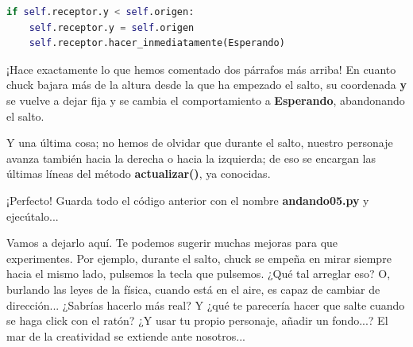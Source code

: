 \documentclass{article}
\begin{document}
\begin{lstlisting}[language=Python]
if self.receptor.y < self.origen:
    self.receptor.y = self.origen
    self.receptor.hacer_inmediatamente(Esperando)
\end{lstlisting}
\vspace{\baselineskip}

¡Hace exactamente lo que hemos comentado dos párrafos más arriba! En cuanto chuck bajara más de la altura desde la que ha empezado el salto, su coordenada \textbf{y} se vuelve a dejar fija y se cambia el comportamiento a \textbf{Esperando}, abandonando el salto.\par
Y una última cosa; no hemos de olvidar que durante el salto, nuestro personaje avanza también hacia la derecha o hacia la izquierda; de eso se encargan las últimas líneas del método \textbf{actualizar()}, ya conocidas.\par
¡Perfecto! Guarda todo el código anterior con el nombre \textbf{andando05.py} y ejecútalo...\par


Vamos a dejarlo aquí. Te podemos sugerir muchas mejoras para que experimentes. Por ejemplo, durante el salto, chuck se empeña en mirar siempre hacia el mismo lado, pulsemos la tecla que pulsemos. ¿Qué tal arreglar eso? O, burlando las leyes de la física, cuando está en el aire, es capaz de cambiar de dirección... ¿Sabrías hacerlo más real? Y ¿qué te parecería hacer que salte cuando se haga click con el ratón? ¿Y usar tu propio personaje, añadir un fondo...? El mar de la creatividad se extiende ante nosotros...\par
\end{document}
